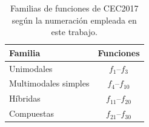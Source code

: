 \begin{table}[H]
    \centering
    \begin{tabular}{lc}
        \toprule
        \textbf{Familia}     & \textbf{Funciones}     \\
        \midrule
        Unimodales           & \(f_1\)--\(f_3\)       \\
        Multimodales simples & \(f_4\)--\(f_{10}\)    \\
        Híbridas             & \(f_{11}\)--\(f_{20}\) \\
        Compuestas           & \(f_{21}\)--\(f_{30}\) \\
        \bottomrule
    \end{tabular}
    \caption{Familias de funciones de CEC2017 según la numeración empleada en este trabajo.}
    \label{tab:familias_cec2017}
\end{table}